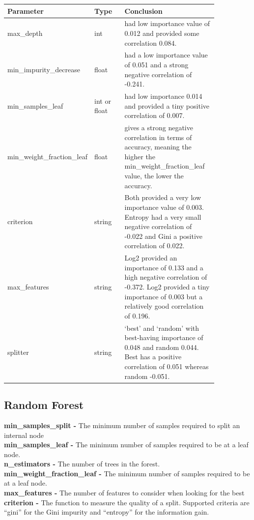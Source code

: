 \documentclass[11pt]{article}
\begin{document}
\begin{table}[ht]
  \centering
  \begin{tabular}{|p{0.25\linewidth} | p{0.15 \linewidth} | p{0.45\linewidth}|} 
    \hline
    \textbf{Parameter}  & \textbf{Type} &\textbf{Conclusion} \\ \hline
    max\_depth & int & had low importance value of 0.012 and provided some correlation 0.084. \\ \hline
    min\_impurity\_decrease & float & had a low importance value of 0.051 and a strong negative correlation of -0.241.  \\ \hline
    min\_samples\_leaf & int or float & had low importance 0.014 and provided a tiny positive correlation of 0.007. \\ \hline
    min\_weight\_fraction\_leaf & float & gives a strong negative correlation in terms of accuracy, meaning the higher the min\_weight\_fraction\_leaf value, the lower the accuracy.\\ \hline
    criterion & string & Both provided a very low importance value of 0.003. Entropy had a very small negative correlation of -0.022 and Gini a positive correlation of 0.022. \\ \hline
    max\_features & string & Log2 provided an importance of 0.133 and a high negative correlation of -0.372. Log2 provided a tiny importance of 0.003 but a relatively good correlation of 0.196. \\ \hline
    splitter & string & ‘best’ and ‘random’ with best-having importance of 0.048 and random 0.044. Best has a positive correlation of 0.051 whereas random -0.051. \\ \hline
  \end{tabular}
\end{table}\label{RF_Analysis_Table}


\newpage
\subsection{Random Forest}
\textbf{min\_samples\_split -} The minimum number of samples required to split an internal node \\
\textbf{min\_samples\_leaf -} The minimum number of samples required to be at a leaf node.  \\
\textbf{n\_estimators -} The number of trees in the forest.\\
\textbf{min\_weight\_fraction\_leaf -} The minimum number of samples required to be at a leaf node. \\
\textbf{max\_features -} The number of features to consider when looking for the best \\
\textbf{criterion -} The function to measure the quality of a split. Supported criteria are “gini” for the Gini impurity and “entropy” for the information gain. \\
\end{document}
